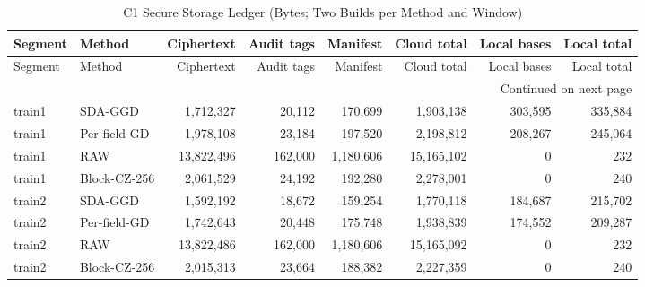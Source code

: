 \begingroup\small\setlength{\tabcolsep}{5pt}
\begin{longtable}{@{}llrrrrrr@{}}
\caption{C1 Secure Storage Ledger (Bytes; Two Builds per Method and Window)}\label{tab:key-c1-statistics}\\
\toprule Segment & Method & Ciphertext & Audit tags & Manifest & Cloud total & Local bases & Local total\\\midrule\endfirsthead
\toprule Segment & Method & Ciphertext & Audit tags & Manifest & Cloud total & Local bases & Local total\\\midrule\endhead
\midrule\multicolumn{8}{r}{Continued on next page}\\\endfoot
\bottomrule\endlastfoot
train1 & SDA-GGD & 1,712,327 & 20,112 & 170,699 & 1,903,138 & 303,595 & 335,884\\
train1 & Per-field-GD & 1,978,108 & 23,184 & 197,520 & 2,198,812 & 208,267 & 245,064\\
train1 & RAW & 13,822,496 & 162,000 & 1,180,606 & 15,165,102 & 0 & 232\\
train1 & Block-CZ-256 & 2,061,529 & 24,192 & 192,280 & 2,278,001 & 0 & 240\\
train2 & SDA-GGD & 1,592,192 & 18,672 & 159,254 & 1,770,118 & 184,687 & 215,702\\
train2 & Per-field-GD & 1,742,643 & 20,448 & 175,748 & 1,938,839 & 174,552 & 209,287\\
train2 & RAW & 13,822,486 & 162,000 & 1,180,606 & 15,165,092 & 0 & 232\\
train2 & Block-CZ-256 & 2,015,313 & 23,664 & 188,382 & 2,227,359 & 0 & 240\\
\end{longtable}
\endgroup
